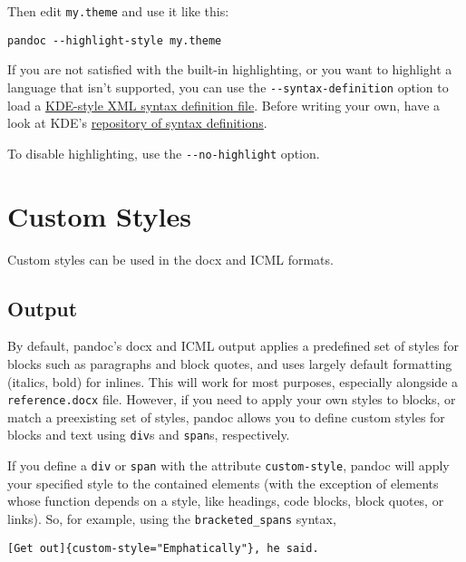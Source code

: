 \documentclass[
]{article}
\begin{document}
Then edit \texttt{my.theme} and use it like this:

\begin{verbatim}
pandoc --highlight-style my.theme
\end{verbatim}

If you are not satisfied with the built-in highlighting, or you want to
highlight a language that isn't supported, you can use the
\texttt{-\/-syntax-definition} option to load a
\href{https://docs.kde.org/stable5/en/kate/katepart/highlight.html}{KDE-style
XML syntax definition file}. Before writing your own, have a look at
KDE's
\href{https://github.com/KDE/syntax-highlighting/tree/master/data/syntax}{repository
of syntax definitions}.

To disable highlighting, use the \texttt{-\/-no-highlight} option.

\hypertarget{custom-styles}{%
\section{Custom Styles}\label{custom-styles}}

Custom styles can be used in the docx and ICML formats.

\hypertarget{output}{%
\subsection{Output}\label{output}}

By default, pandoc's docx and ICML output applies a predefined set of
styles for blocks such as paragraphs and block quotes, and uses largely
default formatting (italics, bold) for inlines. This will work for most
purposes, especially alongside a \texttt{reference.docx} file. However,
if you need to apply your own styles to blocks, or match a preexisting
set of styles, pandoc allows you to define custom styles for blocks and
text using \texttt{div}s and \texttt{span}s, respectively.

If you define a \texttt{div} or \texttt{span} with the attribute
\texttt{custom-style}, pandoc will apply your specified style to the
contained elements (with the exception of elements whose function
depends on a style, like headings, code blocks, block quotes, or links).
So, for example, using the \texttt{bracketed\_spans} syntax,

\begin{verbatim}
[Get out]{custom-style="Emphatically"}, he said.
\end{verbatim}
\end{document}
